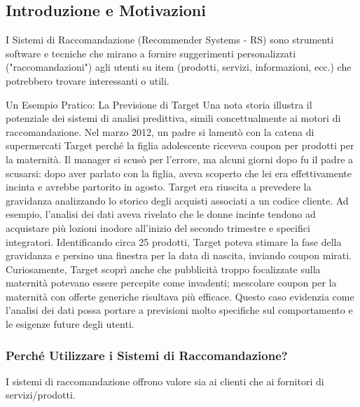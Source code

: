 \documentclass{article}
\begin{document}
\subsection{Introduzione e Motivazioni}
I Sistemi di Raccomandazione (Recommender Systems - RS) sono strumenti software e tecniche che mirano a fornire suggerimenti personalizzati ("raccomandazioni") agli utenti su item (prodotti, servizi, informazioni, ecc.) che potrebbero trovare interessanti o utili.

\begin{examplebox}{Un Esempio Pratico: La Previsione di Target}
    Una nota storia illustra il potenziale dei sistemi di analisi predittiva, simili concettualmente ai motori di raccomandazione. Nel marzo 2012, un padre si lamentò con la catena di supermercati Target perché la figlia adolescente riceveva coupon per prodotti per la maternità. Il manager si scusò per l'errore, ma alcuni giorni dopo fu il padre a scusarsi: dopo aver parlato con la figlia, aveva scoperto che lei era effettivamente incinta e avrebbe partorito in agosto.
    Target era riuscita a prevedere la gravidanza analizzando lo storico degli acquisti associati a un codice cliente. Ad esempio, l'analisi dei dati aveva rivelato che le donne incinte tendono ad acquistare più lozioni inodore all'inizio del secondo trimestre e specifici integratori. Identificando circa 25 prodotti, Target poteva stimare la fase della gravidanza e persino una finestra per la data di nascita, inviando coupon mirati. Curiosamente, Target scoprì anche che pubblicità troppo focalizzate sulla maternità potevano essere percepite come invadenti; mescolare coupon per la maternità con offerte generiche risultava più efficace. Questo caso evidenzia come l'analisi dei dati possa portare a previsioni molto specifiche sul comportamento e le esigenze future degli utenti.
\end{examplebox}

\subsubsection{Perché Utilizzare i Sistemi di Raccomandazione?}
I sistemi di raccomandazione offrono valore sia ai clienti che ai fornitori di servizi/prodotti.
\end{document}
